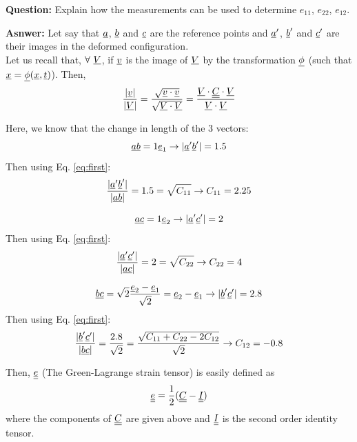 \documentclass[letter,12pt]{article}
\begin{document}
	\noindent \textbf{Question:} Explain how the measurements can be used to determine $e_{11}$, $e_{22}$, $e_{12}$.

 \noindent \textbf{Asnwer:} Let say that $\underline{a}$, $\underline{b}$ and $\underline{c}$ are the reference points and $\underline{a}'$, $\underline{b}'$ and $\underline{c}'$ are their images in the deformed configuration. \\
 
 Let us recall that, $\forall \text{ }\underline{V}$, if $\underline{v}$ is the image of $\underline{V}$ by the transformation $\underline{\phi}$ (such that $\underline{x} = \underline{\phi} (\underline{x}, \underline{t})$). Then,
 \begin{equation}
 \frac{|\underline{v}|}{|\underline{V}|} = \frac{\sqrt{\underline{v} \cdot \underline{v}}}{\sqrt{\underline{V} \cdot \underline{V}}} = \frac{\underline{V} \cdot \underline{\underline{C}} \cdot \underline{V}}{\underline{V} \cdot \underline{V}}
 \label{eq:first}
 \end{equation}
 
 Here, we know that the change in length of the 3 vectors:
 \begin{equation}
 \underline{a} \underline{b} = 1 \underline{e}_1  \rightarrow |\underline{a}'\underline{b}'| = 1.5
 \end{equation}
 Then using Eq. \ref{eq:first}: 
 \begin{equation}
 \frac{|\underline{a}'\underline{b}'|}{|\underline{a} \underline{b}|} = 1.5 = \sqrt{C_{11}} \rightarrow C_{11} = 2.25
 \end{equation}
 
  \begin{equation}
 \underline{a} \underline{c} = 1 \underline{e}_2  \rightarrow |\underline{a}'\underline{c}'| = 2
 \end{equation}
 Then using Eq. \ref{eq:first}: 
 \begin{equation}
 \frac{|\underline{a}'\underline{c}'|}{|\underline{a} \underline{c}|} = 2 = \sqrt{C_{22}} \rightarrow C_{22} = 4
 \end{equation}
 
  \begin{equation}
 \underline{b} \underline{c} = \sqrt{2} \frac{\underline{e}_2 - \underline{e}_1}{\sqrt{2}} = \underline{e}_2 - \underline{e}_1  \rightarrow |\underline{b}'\underline{c}'| = 2.8
 \end{equation}
 Then using Eq. \ref{eq:first}: 
 \begin{equation}
 \frac{|\underline{b}'\underline{c}'|}{|\underline{b} \underline{c}|} = \frac{2.8}{\sqrt{2}} = \frac{\sqrt{C_{11} + C_{22} - 2C_{12}}}{\sqrt{2}} \rightarrow C_{12} = -0.8
 \end{equation}

Then, $\underline{\underline{e}}$ (The Green-Lagrange strain tensor) is easily defined as
\begin{equation}
\underline{\underline{e}} = \frac{1}{2} (\underline{\underline{C}} - \underline{\underline{I}})
\end{equation}
where the components of $\underline{\underline{C}}$ are given above and $\underline{\underline{I}}$ is the second order identity tensor.

 
 
 


 
\end{document}
